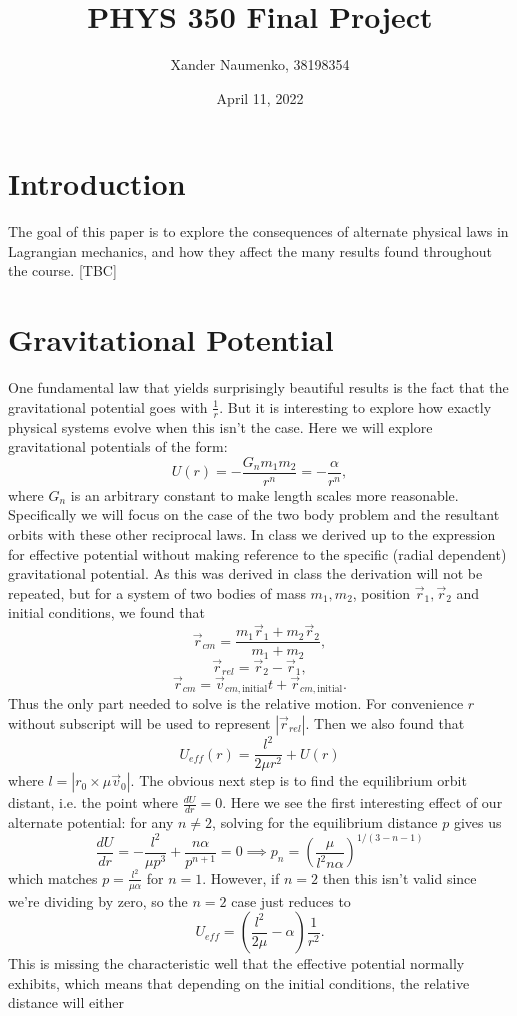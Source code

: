 \documentclass[letterpaper, reqno,11pt]{article}
\begin{document}
\title{PHYS 350 Final Project}
\date{April 11, 2022}
\author{Xander Naumenko, 38198354}
\maketitle

\tableofcontents

\section{Introduction}
 
The goal of this paper is to explore the consequences of alternate physical laws in Lagrangian mechanics, and how they affect the many results found throughout the course. [TBC]

\section{Gravitational Potential}

One fundamental law that yields surprisingly beautiful results is the fact that the gravitational potential goes with $\frac{1}{r}$. But it is interesting to explore how exactly physical systems evolve when this isn't the case. Here we will explore gravitational potentials of the form: 
\[
U(r)=-\frac{G_nm_1m_2}{r^{n}}=-\frac{\alpha}{r^{n}}
,\]
where $G_n$ is an arbitrary constant to make length scales more reasonable. Specifically we will focus on the case of the two body problem and the resultant orbits with these other reciprocal laws. In class we derived up to the expression for effective potential without making reference to the specific (radial dependent) gravitational potential. As this was derived in class the derivation will not be repeated, but for a system of two bodies of mass $ m_1, m_2$, position $\vec r_1, \vec r_2$ and initial conditions, we found that 
\[
\vec r_{cm}=\frac{m_1\vec r_1+m_2\vec r_2}{m_1+m_2}
,\]
\[
\vec r_{rel}=\vec r_2-\vec r_1
,\]
\[
\vec r_{cm}=\vec v_{cm, \text{initial}}t+\vec r_{cm, \text{initial}}
.\]
Thus the only part needed to solve is the relative motion. For convenience $r$ without subscript will be used to represent $|\vec r_{rel}|$. Then we also found that 
 \[
U_{eff}(r)=\frac{l^2}{2\mu r^2}+U(r)
\]
where $l=\left| r_0\times \mu\vec v_0 \right| $. The obvious next step is to find the equilibrium orbit distant, i.e. the point where $\frac{dU}{dr}=0$. Here we see the first interesting effect of our alternate potential: for any $n\neq 2$, solving for the equilibrium distance $p$ gives us
\[
\frac{dU}{dr}=-\frac{l^2}{\mu p^3}+\frac{n\alpha}{p^{n+1}}=0\implies p_n=\left( \frac{\mu}{l^2 n\alpha} \right)^{1 /(3-n-1)}
\]
which matches $p=\frac{l^2}{\mu\alpha}$ for $n=1$. However, if $n=2$ then this isn't valid since we're dividing by zero, so the $n=2$ case just reduces to
\[
U_{eff}=\left( \frac{l^2}{2\mu}-\alpha \right)\frac{1}{r^2}
.\]
This is missing the characteristic well that the effective potential normally exhibits, which means that depending on the initial conditions, the relative distance will either 
\end{document}

